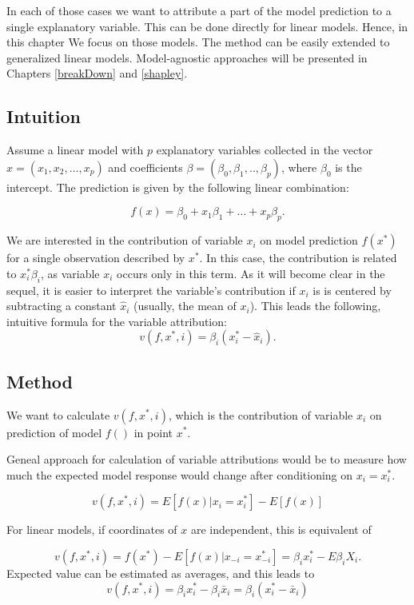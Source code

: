 \documentclass[]{krantz}
\theoremstyle{definition}
\theoremstyle{definition}
\theoremstyle{definition}
\theoremstyle{remark}
\begin{document}
In each of those cases we want to attribute a part of the model
prediction to a single explanatory variable. This can be done directly
for linear models. Hence, in this chapter We focus on those models. The
method can be easily extended to generalized linear models.
Model-agnostic approaches will be presented in Chapters \ref{breakDown}
and \ref{shapley}.

\hypertarget{intuition}{%
\subsection{Intuition}\label{intuition}}

Assume a linear model with \(p\) explanatory variables collected in the
vector \(x = (x_1, x_2, \ldots, x_p)\) and coefficients
\(\beta = (\beta_0, \beta_1, .., \beta_p)\), where \(\beta_0\) is the
intercept. The prediction is given by the following linear combination:

\[
f(x) = \beta_0 + x_1 \beta_1 + \ldots + x_p \beta_p.
\]

We are interested in the contribution of variable \(x_i\) on model
prediction \(f(x^*)\) for a single observation described by \(x^*\). In
this case, the contribution is related to \(x^*_i\beta_i\), as variable
\(x_i\) occurs only in this term. As it will become clear in the sequel,
it is easier to interpret the variable's contribution if \(x_i\) is is
centered by subtracting a constant \(\hat x_i\) (usually, the mean of
\(x_i\)). This leads the following, intuitive formula for the variable
attribution: \[
v(f, x^*, i) = \beta_i (x_i^* - \hat x_i).
\]

\hypertarget{method}{%
\subsection{Method}\label{method}}

We want to calculate \(v(f, x^*, i)\), which is the contribution of
variable \(x_i\) on prediction of model \(f()\) in point \(x^*\).

Geneal approach for calculation of variable attributions would be to
measure how much the expected model response would change after
conditioning on \(x_i = x_i^*\).

\[
v(f, x^*, i) = E[f(x) | x_i = x_i^*] - E[f(x)]
\]

For linear models, if coordinates of \(x\) are independent, this is
equivalent of

\[
v(f, x^*, i) = f(x^*) - E[f(x)|x_{-i} = x^*_{-i}] = \beta_i x^*_i  - E \beta_i X_i.
\] Expected value can be estimated as averages, and this leads to\\
\[
v(f, x^*, i) = \beta_i x^*_i - \beta_i \bar x_i = \beta_i (x^*_i - \bar x_i)
\]
\end{document}
